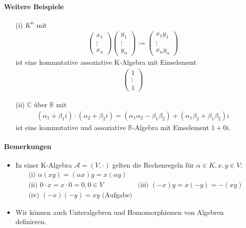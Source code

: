 \documentclass[11pt]{report}
\newcommand*\Zb[1] {\mathbb{#1}}
\begin{document}
\paragraph{Weitere Beispiele}
\begin{itemize}
 \item[(i)] $K^n$ mit
\begin{align}
 \begin{pmatrix} x_1 \\ \vdots \\ x_n\end{pmatrix}  \begin{pmatrix} y_1 \\ \vdots \\ y_n\end{pmatrix} :=  \begin{pmatrix} x_1 y_1 \\ \vdots \\ x_n y_n\end{pmatrix}
\end{align}
ist eine kommutative assoziative K-Algebra mit Einselement 
\begin{align}
\begin{pmatrix} 1 \\ \vdots \\ 1\end{pmatrix}  
\end{align}
 \item[(ii)] $\Zb{C}$ über $\Zb{R}$ mit
\begin{align}
 (\alpha_1 + \beta_1 i) \cdot (\alpha_2 + \beta_2 i) = (\alpha_1 \alpha_2 - \beta_1 \beta_2) + (\alpha_1 \beta_2 + \beta_1 \beta_2) i
\end{align}
ist eine kommutative und assoziative $\Zb{R}$-Algebra mit Einselement $1 + 0i$.
\end{itemize}

\paragraph{Bemerkungen}
\begin{itemize}
\item In einer K-Algebra $\mathcal{A} = (V, \cdot)$ gelten die Rechenregeln für $\alpha \in K, x,y \in V$:
\begin{align}
&\text{(i) } \alpha (xy) = (\alpha x) y = x(\alpha y) \\
&\text{(ii) } 0 \cdot x = x \cdot 0 = 0, 0 \in V
&\text{(iii) } (-x)y = x(-y) = -(xy)\\
&\text{(iv) } (-x)(-y) = xy \text{ (Aufgabe)}
\end{align}
\item Wir können auch Unteralgebren und Homomorphismen von Algebren definieren.
\end{itemize}
\end{document}
